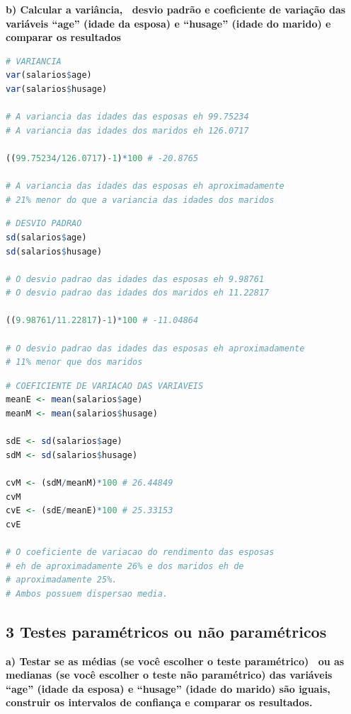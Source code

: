 \begin{adjustwidth}{1em}{}
\textbf{b) Calcular a variância, \ desvio padrão e coeficiente de variação das variáveis “age” (idade da esposa) e
“husage” (idade do marido) e comparar os resultados}
\end{adjustwidth}
\begin{lstlisting}[language=R, style=input] 
# VARIANCIA
var(salarios$age)
var(salarios$husage)

# A variancia das idades das esposas eh 99.75234
# A variancia das idades dos maridos eh 126.0717

((99.75234/126.0717)-1)*100 # -20.8765

# A variancia das idades das esposas eh aproximadamente 
# 21% menor do que a variancia das idades dos maridos
\end{lstlisting}
\begin{lstlisting}[language=R, style=input] 
# DESVIO PADRAO
sd(salarios$age)
sd(salarios$husage)

# O desvio padrao das idades das esposas eh 9.98761
# O desvio padrao das idades dos maridos eh 11.22817

((9.98761/11.22817)-1)*100 # -11.04864

# O desvio padrao das idades das esposas eh aproximadamente 
# 11% menor que dos maridos
\end{lstlisting}
\begin{lstlisting}[language=R, style=input] 
# COEFICIENTE DE VARIACAO DAS VARIAVEIS
meanE <- mean(salarios$age)
meanM <- mean(salarios$husage)

sdE <- sd(salarios$age)
sdM <- sd(salarios$husage)

cvM <- (sdM/meanM)*100 # 26.44849
cvM
cvE <- (sdE/meanE)*100 # 25.33153
cvE

# O coeficiente de variacao do rendimento das esposas 
# eh de aproximadamente 26% e dos maridos eh de 
# aproximadamente 25%. 
# Ambos possuem dispersao media.
\end{lstlisting}


\subsection*{\textbf{3 Testes paramétricos ou não paramétricos}}

\begin{adjustwidth}{1em}{}
\textbf{a) Testar se as médias (se você escolher o teste paramétrico) \ ou as medianas (se você escolher o teste não
paramétrico) das variáveis “age” (idade da esposa) e “husage” (idade do marido) são iguais, construir os intervalos de
confiança e comparar os resultados.}
\end{adjustwidth}

